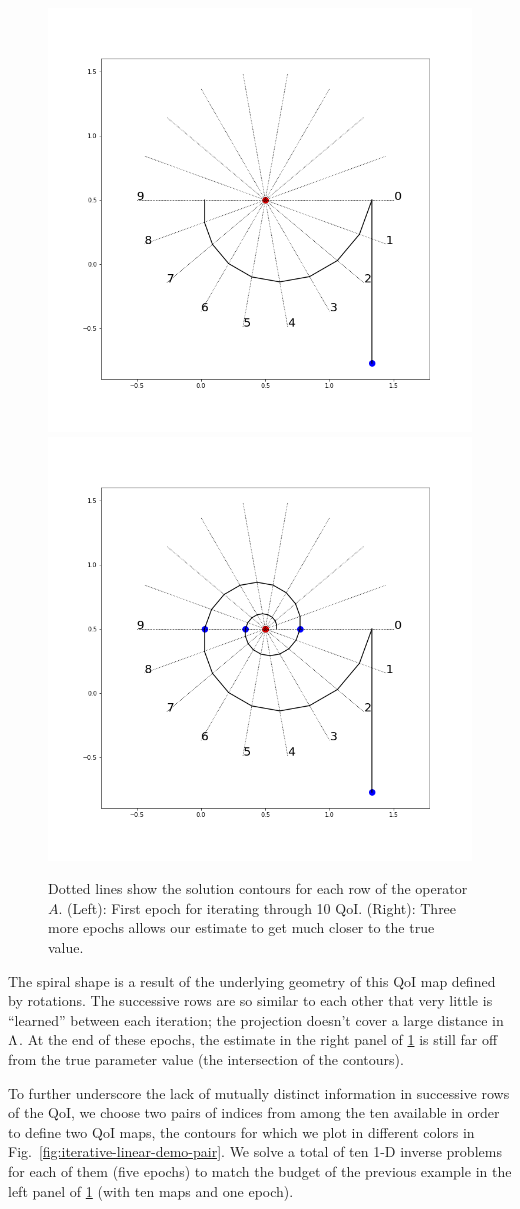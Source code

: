 \begin{figure}
  \centering
  \includegraphics[width=0.475\linewidth]{examples/iterative/10D-firstepoch.png}
  \includegraphics[width=0.475\linewidth]{examples/iterative/10D-fewepochs.png}

  \caption{
  Dotted lines show the solution contours for each row of the operator $A$.
  (Left): First epoch for iterating through 10 QoI.
  (Right): Three more epochs allows our estimate to get much closer to the true value.
  }
  \label{fig:iterative-linear-demo}
\end{figure}

The spiral shape is a result of the underlying geometry of this QoI map defined by rotations. The successive rows are so similar to each other that very little is ``learned'' between each iteration; the projection doesn't cover a large distance in ${\Lambda}$.
At the end of these epochs, the estimate in the right panel of \ref{fig:iterative-linear-demo} is still far off from the true parameter value (the intersection of the contours).

To further underscore the lack of mutually distinct information in successive rows of the QoI, we choose two pairs of indices from among the ten available in order to define two QoI maps, the contours for which we plot in different colors in Fig.~\ref{fig:iterative-linear-demo-pair}.
We solve a total of ten 1-D inverse problems for each of them (five epochs) to match the budget of the previous example in the left panel of \ref{fig:iterative-linear-demo} (with ten maps and one epoch).

